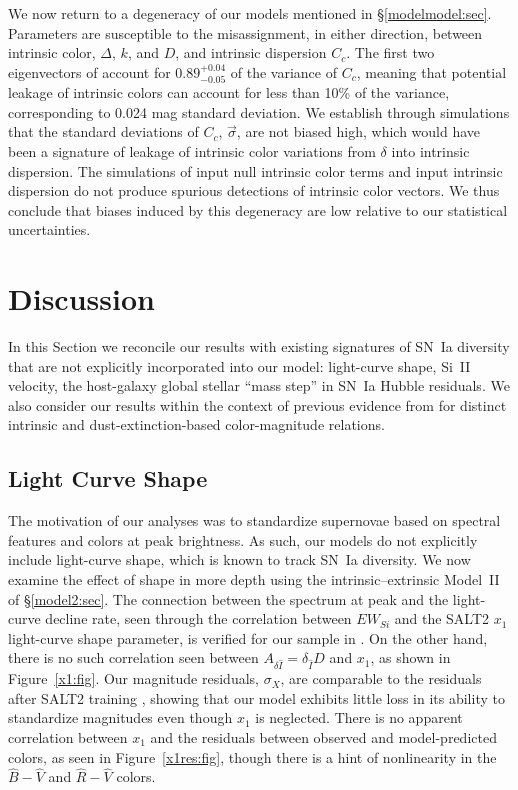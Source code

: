 \documentclass{aastex61}   	%
\begin{document}
\color{blue}
We now return to a degeneracy of our models mentioned in \S\ref{modelmodel:sec}.
Parameters are susceptible to the misassignment, in either direction, between intrinsic color, $\Delta$, $k$, and $D$, and intrinsic dispersion $C_c$.
The first two eigenvectors of account for $0.89_{-0.05}^{+0.04}$ of the variance of $C_c$, meaning
that potential leakage of intrinsic colors can account for less than 10\% of the variance, corresponding to 0.024 mag standard deviation.
We establish through simulations that the standard deviations of $C_c$, $\vec{\sigma}$,  are not biased high, which would have been a signature of leakage of
intrinsic color variations from $\delta$ into intrinsic dispersion.
The simulations of input null intrinsic color terms and input intrinsic dispersion do not produce spurious detections of intrinsic color vectors.  We thus conclude that
biases induced by this degeneracy are low relative to our statistical uncertainties.
\color{black}

\section{Discussion}
\label{discussion:sec}
In this Section
we  reconcile our results with existing
signatures of SN~Ia diversity that are not explicitly incorporated
into our model: light-curve shape, Si~II velocity, the host-galaxy global stellar ``mass step'' in SN~Ia Hubble
residuals.
We also consider our results within the context of previous evidence from
  for distinct intrinsic and dust-extinction-based
color-magnitude relations.

\subsection{Light Curve Shape}
\label{shape:sec}
The motivation of our analyses was to standardize supernovae based on spectral features and colors at peak brightness.
As such, our models do not explicitly include light-curve shape, which is known to track SN~Ia diversity.
We now examine the effect of shape in more depth using the intrinsic--extrinsic Model~II of \S\ref{model2:sec}.
The connection between the spectrum at peak and the light-curve decline rate, seen through
the correlation between $EW_{Si}$ and the SALT2 $x_1$ light-curve shape parameter, is verified
for our sample in \citet{2017Chotard}.
On the other hand, there is no such correlation seen between $A_{\delta {\hat{I}}} = \delta_{\hat{I}} D$ and $x_1$, as shown in Figure~\ref{x1:fig}. 
Our magnitude residuals, $\sigma_X$, are comparable to the residuals after SALT2 training
\citep{2010A&A...523A...7G}, showing that our model exhibits little loss in its ability to standardize
magnitudes even though $x_1$ is neglected.
There is no apparent correlation
between $x_1$ and the residuals between observed and model-predicted colors, as seen in
Figure~\ref{x1res:fig},
though there is a hint of nonlinearity in the ${\hat{B}}-{\hat{V}}$ and ${\hat{R}}-{\hat{V}}$ colors.
\end{document}
